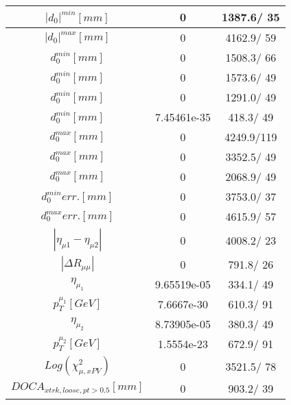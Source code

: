 \documentclass{article}
\begin{document}
\begin{table}[htbp]
\begin{center}
\begin{tabular}{c|c|c}
\hline
$|d_{0}|^{min} [mm]$ & 0 & 1387.6/ 35\\
\hline
$|d_{0}|^{max} [mm]$ & 0 & 4162.9/ 59\\
\hline
$d_{0}^{min} [mm]$ & 0 & 1508.3/ 66\\
\hline
$d_{0}^{min} [mm]$ & 0 & 1573.6/ 49\\
\hline
$d_{0}^{min} [mm]$ & 0 & 1291.0/ 49\\
\hline
$d_{0}^{min} [mm]$ & 7.45461e-35 & 418.3/ 49\\
\hline
$d_{0}^{max} [mm]$ & 0 & 4249.9/119\\
\hline
$d_{0}^{max} [mm]$ & 0 & 3352.5/ 49\\
\hline
$d_{0}^{max} [mm]$ & 0 & 2068.9/ 49\\
\hline
$d_{0}^{min} err. [mm]$ & 0 & 3753.0/ 37\\
\hline
$d_{0}^{max} err. [mm]$ & 0 & 4615.9/ 57\\
\hline
$|\eta_{\mu1}-\eta_{\mu2}|$ & 0 & 4008.2/ 23\\
\hline
$|\Delta R_{\mu \mu}|$ & 0 & 791.8/ 26\\
\hline
$\eta_{\mu_{1}}$ & 9.65519e-05 & 334.1/ 49\\
\hline
$p_{T}^{\mu_{1}} [GeV]$ & 7.6667e-30 & 610.3/ 91\\
\hline
$\eta_{\mu_{2}}$ & 8.73905e-05 & 380.3/ 49\\
\hline
$p_{T}^{\mu_{2}} [GeV]$ & 1.5554e-23 & 672.9/ 91\\
\hline
$Log(\chi^{2}_{\mu,xPV})$ & 0 & 3521.5/ 78\\
\hline
$DOCA_{xtrk, loose, pt>0.5} [mm]$ & 0 & 903.2/ 39\\
\hline
\end{tabular}
\end{center}
\end{table}
\end{document}

